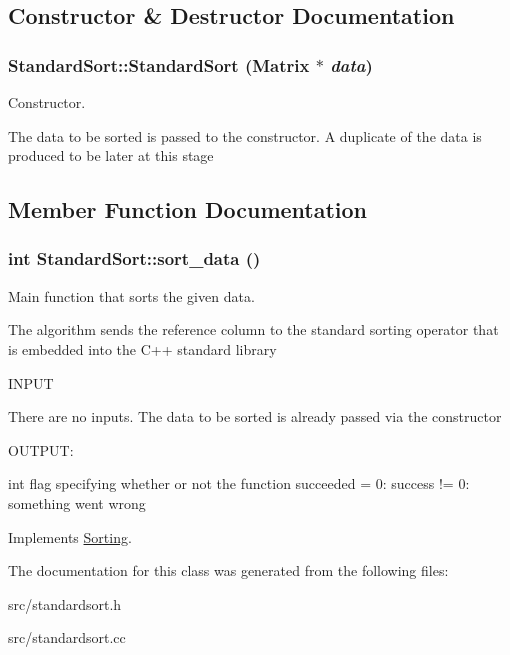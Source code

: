 \subsection{Constructor \& Destructor Documentation}
\hypertarget{classStandardSort_afecdf65f1388c1d23339c99f799131fd}{
\subsubsection[{StandardSort}]{\setlength{\rightskip}{0pt plus 5cm}StandardSort::StandardSort ({\bf Matrix} $\ast$ {\em data})}}
\label{d0/d94/classStandardSort_afecdf65f1388c1d23339c99f799131fd}


Constructor. 

The data to be sorted is passed to the constructor. A duplicate of the data is produced to be later at this stage 

\subsection{Member Function Documentation}
\hypertarget{classStandardSort_ae0c7e47ba48c319989b41815b0724f41}{
\subsubsection[{sort\_\-data}]{\setlength{\rightskip}{0pt plus 5cm}int StandardSort::sort\_\-data ()}}
\label{d0/d94/classStandardSort_ae0c7e47ba48c319989b41815b0724f41}


Main function that sorts the given data. 

The algorithm sends the reference column to the standard sorting operator that is embedded into the C++ standard library

\begin{DoxyVerb}
  INPUT 

  There are no inputs. The data to be sorted is already passed via the constructor

  OUTPUT:

  int       flag specifying whether or not the function succeeded
             = 0: success
	    != 0: something went wrong

\end{DoxyVerb}
 

Implements \hyperlink{classSorting_a6686201265fbb31ba9c2071623742be1}{Sorting}.



The documentation for this class was generated from the following files:\begin{DoxyCompactItemize}
\item 
src/standardsort.h\item 
src/standardsort.cc\end{DoxyCompactItemize}
